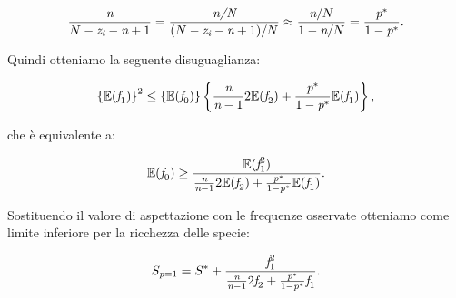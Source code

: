  $$
 \frac{\emph{n}}{N-\emph{z}_\emph{i}-\emph{n}+1}=\frac{\emph{n/N}}{(N-\emph{z}_\emph{i}-\emph{n}+1)/N} \approx \frac{\emph{n}/N}{1-\emph{n}/N}=\frac{\emph{p}^*}{1-\emph{p}^*}.
 $$
 
 Quindi otteniamo la seguente disuguaglianza:
 
$$
\left \{ \mathbb{E}(\emph{f}_1) \right \}^2 \le \left \{ \mathbb{E}(\emph{f}_0) \right \}\left \{ \frac{\emph{n}}{\emph{n}-1}2\mathbb{E}(\emph{f}_2) + \frac{\emph{p}^*}{1-\emph{p}^*}\mathbb{E}(\emph{f}_1) \right \},
$$

che è equivalente a:


\begin{equation}
\mathbb{E}(\emph{f}_0) \ge \frac{\mathbb{E}(\emph{f}_1^2)}{\frac{\emph{n}}{\emph{n}-1}2\mathbb{E}(\emph{f}_2)+ \frac{\emph{p}^*}{1-\emph{p}^*}\mathbb{E}(\emph{f}_1)}.
\end{equation}

Sostituendo il valore di aspettazione con le frequenze osservate otteniamo come limite inferiore per la ricchezza delle specie:

\begin{equation}
    S_{\emph{p}=1}= S^* +\frac{\emph{f}_1^2}{\frac{\emph{n}}{\emph{n}-1}2\emph{f}_2+ \frac{\emph{p}^*}{1-\emph{p}^*}\emph{f}_1}.
    \label{eq:chaoworestimator}
\end{equation}



%
%
%
%
